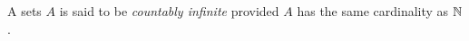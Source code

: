 \guard



\begin{defn}
\label{defn:countablyInfinite}
  A sets $A$ is said to be \emph{countably infinite} provided $A$ has the same cardinality as $\mathbb{N}$.
\end{defn}
